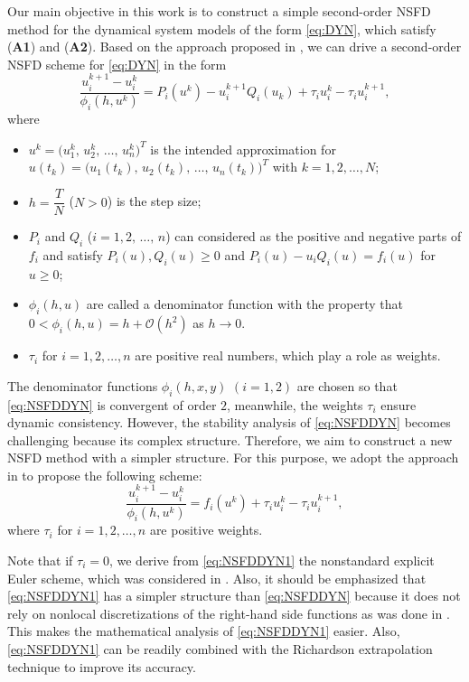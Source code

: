 \documentclass[12pt]{article}
\theoremstyle{definition}
\theoremstyle{remark}
\numberwithin{equation}{section}
\begin{document}
Our main objective in this work is to construct a simple second-order NSFD method for the dynamical system models of the form \eqref{eq:DYN}, which satisfy (\textbf{A1}) and (\textbf{A2}). Based on the approach proposed in \cite{HoangMatthias2}, we can drive a second-order NSFD scheme for \eqref{eq:DYN} in the form
\begin{equation}\label{eq:NSFDDYN}
\dfrac{u_i^{k + 1} - u_i^k}{\phi_i(h, u^k)} = P_i(u^k) - u_i^{k + 1}Q_i(u_k) + \tau_i u_i^k - \tau_i u_i^{k+1},
\end{equation}
where
\begin{itemize}
\item $u^k = \big(u_1^k,\, u_2^k,\,\ldots,\,u_n^k\big)^T$ is the intended approximation for $u(t_k) = \big(u_1(t_k),\, u_2(t_k),\,\ldots,\,u_n(t_k)\big)^T$ with $k = 1, 2, \ldots, N$;
\item $h = \dfrac{T}{N}$ ($N > 0$) is the step size;
\item $P_i$ and $Q_i$ ($i = 1,2,\,\ldots,\,n$) can considered as the positive and negative parts of $f_i$ and satisfy $P_i(u), Q_i(u) \geq 0$ and $P_i(u) - u_iQ_i(u) = f_i(u)$ for $u \geq 0$;
\item $\phi_i(h, u)$ are called a denominator function with the property that $0 < \phi_i(h, u) = h + \mathcal{O}(h^2)$ as $h \to 0$.
\item $\tau_i$ for $i = 1, 2, \ldots, n$ are positive real numbers, which play a role as weights.
\end{itemize}
The denominator functions $\phi_i(h, x, y)$ $(i = 1, 2)$ are chosen so that \eqref{eq:NSFDDYN} is convergent of order $2$, meanwhile, the weights $\tau_i$ ensure dynamic consistency. However, the stability analysis of \eqref{eq:NSFDDYN} becomes challenging because its complex structure. Therefore, we aim to construct a new NSFD method with a simpler structure. For this purpose, we adopt the approach in \cite{Hoang2023} to propose the following scheme:
\begin{equation}\label{eq:NSFDDYN1}
\dfrac{u_i^{k + 1} - u_i^k}{\phi_i(h, u^k)} = f_i(u^k) + \tau_i u_i^k - \tau_i u_i^{k+1},
\end{equation}
where $\tau_i$ for $i = 1, 2, \ldots, n$ are positive weights.

Note that if $\tau_i = 0$, we derive from \eqref{eq:NSFDDYN1} the nonstandard explicit Euler scheme, which was considered in \cite{Dimitrov, Kojouharov1}. Also, it should be emphasized that \eqref{eq:NSFDDYN1} has a simpler structure than \eqref{eq:NSFDDYN} because it does not rely on nonlocal discretizations of the right-hand side functions as was done in \cite{Alalhareth1, Alalhareth2, Conte, Hoang1, Hoang2, Hoang3, HoangMatthias1, HoangMatthias2, HoangMatthias2026}. This makes the mathematical analysis of \eqref{eq:NSFDDYN1} easier.  Also, \eqref{eq:NSFDDYN1} can be readily combined with the Richardson extrapolation technique \cite{Burden, Richardson, Roy} to improve its accuracy.  
\end{document}
